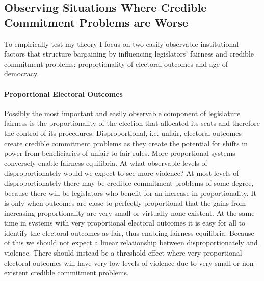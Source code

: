 \documentclass[a4paper]{article}\usepackage[]{graphicx}\usepackage[]{color}
\begin{document}
\subsection{Observing Situations Where Credible Commitment Problems are Worse}

To empirically test my theory I focus on two easily observable institutional factors that structure bargaining by influencing legislators' fairness and credible commitment problems: proportionality of electoral outcomes and age of democracy.

\paragraph{Proportional Electoral Outcomes}

Possibly the most important and easily observable component of legislature fairness is the proportionality of the election that allocated its seats and therefore the control of its procedures. Disproportional, i.e. unfair, electoral outcomes create credible commitment problems as they create the potential for shifts in power from beneficiaries of unfair to fair rules. More proportional systems conversely enable fairness equilibria. At what observable levels of disproportionately would we expect to see more violence? At most levels of disproportionately there may be credible commitment problems of some degree, because there will be legislators who benefit for an increase in proportionality. It is only when outcomes are close to perfectly proportional that the gains from increasing proportionality are very small or virtually none existent. At the same time in systems with very proportional electoral outcomes it is easy for all to identify the electoral outcomes as fair, thus enabling fairness equilibria. Because of this we should not expect a linear relationship between disproportionately and violence. There should instead be a threshold effect where very proportional electoral outcomes will have very low levels of violence due to very small or non-existent credible commitment problems. 
\end{document}
